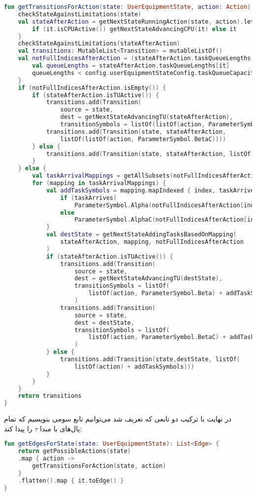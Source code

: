 \begin{latin}
	\begin{lstlisting}[language=Kotlin, title=\rl{تابع محاسبه کنش‌های ممکن به ازای حالت داده شده}]
fun getTransitionsForAction(state: UserEquipmentState, action: Action): List<Transition> {
	checkStateAgainstLimitations(state)
	val stateAfterAction = getNextStateRunningAction(state, action).let {
		if (it.isCPUActive()) getNextStateAdvancingCPU(it) else it
	}
	checkStateAgainstLimitations(stateAfterAction)
	val transitions: MutableList<Transition> = mutableListOf()
	val notFullIndicesAfterAction = (stateAfterAction.taskQueueLengths.indices).filter {
		val queueLengths = stateAfterAction.taskQueueLengths[it]
		queueLengths < config.userEquipmentStateConfig.taskQueueCapacity
	}
	if (notFullIndicesAfterAction.isEmpty()) {
		if (stateAfterAction.isTUActive()) {
			transitions.add(Transition(
				source = state, 
				dest = getNextStateAdvancingTU(stateAfterAction), 
				transitionSymbols = listOf(listOf(action, ParameterSymbol.Beta))))
			transitions.add(Transition(state, stateAfterAction, 
				listOf(listOf(action, ParameterSymbol.BetaC))))
		} else {
			transitions.add(Transition(state, stateAfterAction, listOf(listOf(action))))
		}
	} else {
		val taskArrivalMappings = getAllSubsets(notFullIndicesAfterAction.size)
		for (mapping in taskArrivalMappings) {
			val addTaskSymbols = mapping.mapIndexed { index, taskArrives ->
				if (taskArrives)
					ParameterSymbol.Alpha(notFullIndicesAfterAction[index])
				else
					ParameterSymbol.AlphaC(notFullIndicesAfterAction[index])
			}
			val destState = getNextStateAddingTasksBasedOnMapping(
				stateAfterAction, mapping, notFullIndicesAfterAction
			)
			if (stateAfterAction.isTUActive()) {
				transitions.add(Transition(
					source = state,
					dest = getNextStateAdvancingTU(destState),
					transitionSymbols = listOf(
						listOf(action, ParameterSymbol.Beta) + addTaskSymbols))
					)
				transitions.add(Transition(
					source = state,
					dest = destState,
					transitionSymbols = listOf(
						listOf(action, ParameterSymbol.BetaC) + addTaskSymbols))
					)
			} else {
				transitions.add(Transition(state,destState, listOf(
					listOf(action) + addTaskSymbols)))
			}
		}
	}
	return transitions
}
	\end{lstlisting}
\end{latin}
\newpage
در نهایت با ترکیب دو تابعی که تعریف شد می‌توانیم تابع سومی بنویسیم که تمام یال‌های با مبدا $\tau$ را پیدا کند:
\begin{latin}
	\begin{lstlisting}[language=Kotlin, title=\rl{تابع محاسبه یال‌های زنجیره به ازای حالت مبدا ورودی}]
fun getEdgesForState(state: UserEquipmentState): List<Edge> {
	return getPossibleActions(state)
	.map { action ->
		getTransitionsForAction(state, action)
	}
	.flatten().map { it.toEdge() }
}
	\end{lstlisting}
\end{latin}
\clearpage